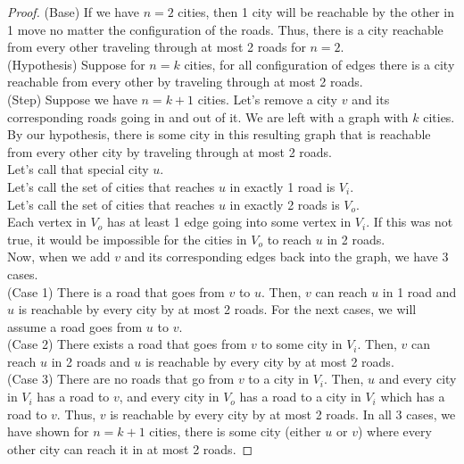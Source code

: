 \documentclass[11pt]{article}
\begin{document}
\begin{solution}\begin{Parts}
\Part \begin{proof}
(Base) If we have $n=2$ cities, then 1 city will be reachable by the other in 1 move no matter the configuration of the roads.
Thus, there is a city reachable from every other traveling through at most 2 roads for $n=2$. 
\\(Hypothesis) Suppose for $n=k$ cities, for all configuration of edges there is a city reachable from every other by traveling through at most 2 roads.
\\(Step) Suppose we have $n=k+1$ cities.
Let's remove a city $v$ and its corresponding roads going in and out of it.
We are left with a graph with $k$ cities.
By our hypothesis, there is some city in this resulting graph that is reachable from every other city by traveling through at most 2 roads.
\\Let's call that special city $u$.
\\Let's call the set of cities that reaches $u$ in exactly 1 road is $V_i$.
\\Let's call the set of cities that reaches $u$ in exactly 2 roads is $V_o$.
\\Each vertex in $V_o$ has at least 1 edge going into some vertex in $V_i$. 
If this was not true, it would be impossible for the cities in $V_o$ to reach $u$ in 2 roads.
\\Now, when we add $v$ and its corresponding edges back into the graph, we have 3 cases.
\\(Case 1) There is a road that goes from $v$ to $u$.
Then, $v$ can reach $u$ in 1 road and $u$ is reachable by every city by at most 2 roads. 
For the next cases, we will assume a road goes from $u$ to $v$.
\\(Case 2) There exists a road that goes from $v$ to some city in $V_i$.
Then, $v$ can reach $u$ in 2 roads and $u$ is reachable by every city by at most 2 roads. 
\\(Case 3) There are no roads that go from $v$ to a city in $V_i$.
Then, $u$ and every city in $V_i$ has a road to $v$,
and every city in $V_o$ has a road to a city in $V_i$ which has a road to $v$.
Thus, $v$ is reachable by every city by at most 2 roads. 
In all 3 cases, we have shown for $n=k+1$ cities, there is some city (either $u$ or $v$) where every other city can reach it in at most 2 roads.
\end{proof}


\end{Parts}
\end{solution}
\end{document}
